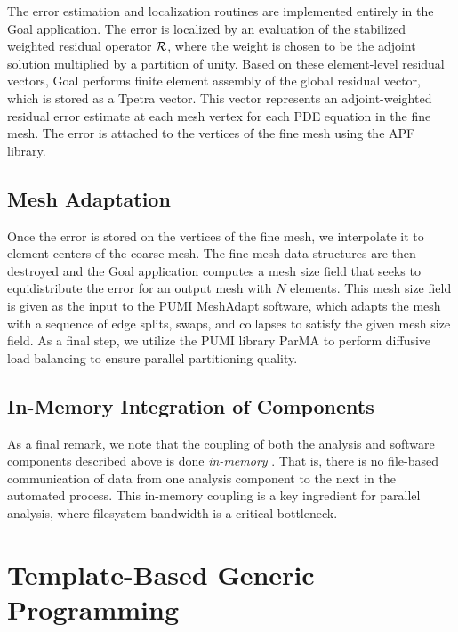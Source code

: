 The error estimation and localization routines are implemented entirely in
the Goal application. The error is localized by an evaluation of the
stabilized weighted residual operator $\mathcal{R}$, where the weight is chosen to be
the adjoint solution multiplied by a partition of unity. Based on these
element-level residual vectors, Goal performs finite element assembly
of the global residual vector, which is stored as a Tpetra vector. This
vector represents an adjoint-weighted residual error estimate at each mesh
vertex for each PDE equation in the fine mesh. The error is attached to the
vertices of the fine mesh using the APF library.

\subsection{Mesh Adaptation}

Once the error is stored on the vertices of the fine mesh, we interpolate
it to element centers of the coarse mesh. The fine mesh data structures are
then destroyed and the Goal application computes a mesh size field that
seeks to equidistribute the error for an output mesh with $N$ elements. This
mesh size field is given as the input to the PUMI MeshAdapt software, which
adapts the mesh with a sequence of edge splits, swaps, and collapses
\cite{li20053d, alauzet2006parallel} to satisfy the given mesh size field.
As a final step, we utilize the PUMI library ParMA
\cite{smith2015parma, diamond2017dynamic}
to perform diffusive
load balancing to ensure parallel partitioning quality.

\subsection{In-Memory Integration of Components}

As a final remark, we note that the coupling of both the analysis and
software components described above is done \emph{in-memory}
\cite{smith2016memory}. That is, there is no file-based communication of
data from one analysis component to the next in the automated process.
This in-memory coupling is a key ingredient for parallel analysis,
where filesystem bandwidth is a critical bottleneck.

\section{Template-Based Generic Programming}
\label{sec:tbgp}

